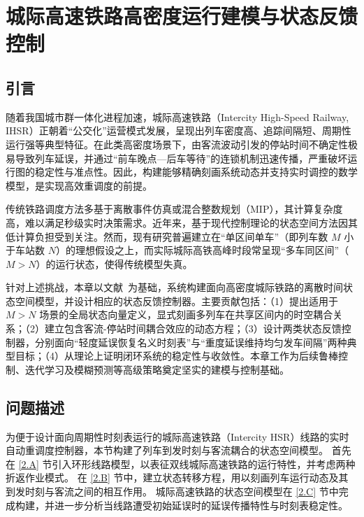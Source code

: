 \chapter{城际高速铁路高密度运行建模与状态反馈控制}
\label{chap:ch2}

\section{引言}
\label{sec:ch2_intro}

随着我国城市群一体化进程加速，城际高速铁路（Intercity High-Speed Railway, IHSR）正朝着“公交化”运营模式发展，呈现出列车密度高、追踪间隔短、周期性运行强等典型特征。在此类高密度场景下，由客流波动引发的停站时间不确定性极易导致列车延误，并通过“前车晚点—后车等待”的连锁机制迅速传播，严重破坏运行图的稳定性与准点性。因此，构建能够精确刻画系统动态并支持实时调控的数学模型，是实现高效重调度的前提。

传统铁路调度方法多基于离散事件仿真或混合整数规划（MIP），其计算复杂度高，难以满足秒级实时决策需求。近年来，基于现代控制理论的状态空间方法因其低计算负担受到关注。然而，现有研究普遍建立在“单区间单车”（即列车数 $M$ 小于车站数 $N$）的理想假设之上，而实际城际高铁高峰时段常呈现“多车同区间”（$M > N$）的运行状态，使得传统模型失真。

针对上述挑战，本章以文献~\cite{Kang2024TITS}为基础，系统构建面向高密度城际铁路的离散时间状态空间模型，并设计相应的状态反馈控制器。主要贡献包括：（1）提出适用于 $M > N$ 场景的全局状态向量定义，显式刻画多列车在共享区间内的时空耦合关系；（2）建立包含客流-停站时间耦合效应的动态方程；（3）设计两类状态反馈控制器，分别面向“轻度延误恢复名义时刻表”与“重度延误维持均匀发车间隔”两种典型目标；（4）从理论上证明闭环系统的稳定性与收敛性。本章工作为后续鲁棒控制、迭代学习及模糊预测等高级策略奠定坚实的建模与控制基础。

\section{问题描述}
\label{problem}
为便于设计面向周期性时刻表运行的城际高速铁路（Intercity HSR）线路的实时自动重调度控制器，本节构建了列车到发时刻与客流耦合的状态空间模型。
首先在 \ref{2.A} 节引入环形线路模型，以表征双线城际高速铁路的运行特性，并考虑两种折返作业模式。
在 \ref{2.B} 节中，建立状态转移方程，用以刻画列车运行动态及其到发时刻与客流之间的相互作用。
城际高速铁路的状态空间模型在 \ref{2.C} 节中完成构建，并进一步分析当线路遭受初始延误时的延误传播特性与时刻表稳定性。

